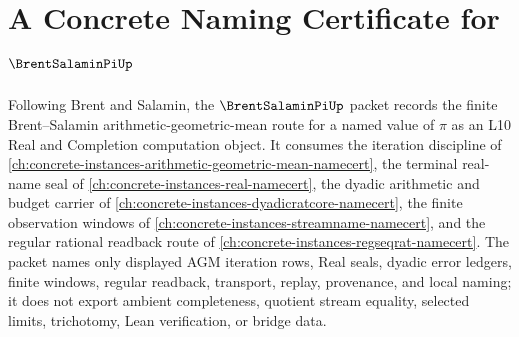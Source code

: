 \chapter{A Concrete Naming Certificate for $\BrentSalaminPiUp$}
\label{ch:concrete-instances-brent-salamin-pi-namecert}

Following Brent and Salamin, the $\BrentSalaminPiUp$ packet records the finite Brent--Salamin arithmetic-geometric-mean route for a named value of $\pi$ as an L10 Real and Completion computation object. It consumes the iteration discipline of \autoref{ch:concrete-instances-arithmetic-geometric-mean-namecert}, the terminal real-name seal of \autoref{ch:concrete-instances-real-namecert}, the dyadic arithmetic and budget carrier of \autoref{ch:concrete-instances-dyadicratcore-namecert}, the finite observation windows of \autoref{ch:concrete-instances-streamname-namecert}, and the regular rational readback route of \autoref{ch:concrete-instances-regseqrat-namecert}. The packet names only displayed AGM iteration rows, Real seals, dyadic error ledgers, finite windows, regular readback, transport, replay, provenance, and local naming; it does not export ambient completeness, quotient stream equality, selected limits, trichotomy, Lean verification, or bridge data.


